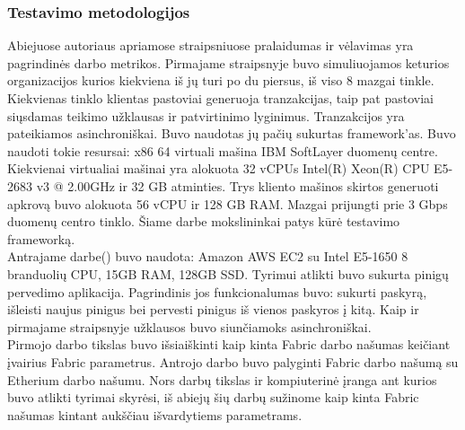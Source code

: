 \documentclass{VUMIFPSkursinis}
\begin{document}
		\subsubsection{Testavimo metodologijos}
			Abiejuose autoriaus apriamose straipsniuose pralaidumas ir vėlavimas yra pagrindinės darbo metrikos. Pirmajame straipsnyje \cite{IMBResearch}  buvo simuliuojamos keturios organizacijos kurios kiekviena iš jų turi po du piersus, iš viso 8 mazgai tinkle. Kiekvienas tinklo klientas pastoviai generuoja tranzakcijas, taip pat pastoviai siųsdamas teikimo užklausas ir patvirtinimo lyginimus. Tranzakcijos yra pateikiamos asinchroniškai. Buvo naudotas jų pačių sukurtas framework'as. Buvo naudoti tokie resursai: x86 64 virtuali mašina IBM SoftLayer duomenų centre. Kiekvienai virtualiai mašinai yra alokuota 32 vCPUs  Intel(R) Xeon(R)
CPU E5-2683 v3 @ 2.00GHz ir 32 GB atminties.  Trys kliento mašinos skirtos generuoti apkrovą buvo alokuota
 56 vCPU ir 128 GB RAM. Mazgai prijungti prie 3 Gbps duomenų centro tinklo. Šiame darbe mokslininkai patys kūrė testavimo frameworką. \\
Antrajame darbe(\cite{ThailandPerf}) buvo naudota: Amazon AWS EC2
 su Intel E5-1650 8 branduolių CPU,
15GB RAM, 128GB SSD. Tyrimui atlikti buvo sukurta pinigų pervedimo aplikacija. Pagrindinis jos funkcionalumas buvo: sukurti paskyrą, išleisti naujus pinigus bei pervesti pinigus iš vienos paskyros į kitą. Kaip ir pirmajame straipsnyje užklausos buvo siunčiamoks asinchroniškai. \\
Pirmojo darbo \cite{IBMResearch} tikslas buvo išsiaiškinti kaip kinta Fabric darbo našumas keičiant įvairius Fabric parametrus. Antrojo darbo \cite{ThailandPerf} 
buvo palyginti Fabric darbo našumą su Etherium darbo našumu. Nors darbų tikslas ir kompiuterinė įranga ant kurios buvo atlikti tyrimai skyrėsi, iš abiejų šių 
darbų sužinome kaip kinta Fabric našumas kintant aukščiau išvardytiems parametrams.
 
\end{document}

